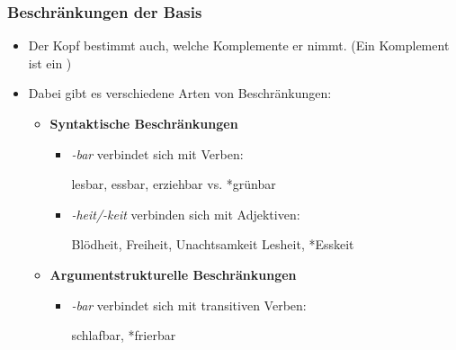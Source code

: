 \begin{frame}
\frametitle{Beschränkungen der Basis}

\begin{itemize}
	\item Der Kopf bestimmt auch, welche Komplemente er nimmt. (Ein Komplement ist ein )
	\item Dabei gibt es verschiedene Arten von Beschränkungen:

\vspace{1em}
	
	\begin{itemize}
		\item \textbf{Syntaktische Beschränkungen}
		
		\begin{itemize}
			\item \textit{-bar} verbindet sich mit Verben:
			
			\ea lesbar, essbar, erziehbar vs. *grünbar
			\z
			
			\item \textit{-heit/-keit} verbinden sich mit Adjektiven:		
			
			\ea Blödheit, Freiheit, Unachtsamkeit \vs *Lesheit, *Esskeit
			\z
			
		\end{itemize}
		
	\item \textbf{Argumentstrukturelle Beschränkungen}
	
		\begin{itemize}
			\item \textit{-bar} verbindet sich mit transitiven Verben:	
			
			\ea *schlafbar, *frierbar
			\z
			
		\end{itemize}
		
	\end{itemize}
	
\end{itemize}

\end{frame}



